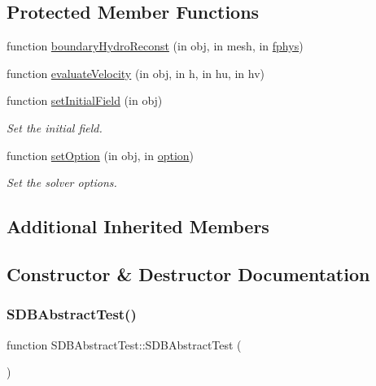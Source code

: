 \subsection*{Protected Member Functions}
\begin{DoxyCompactItemize}
\item 
function \hyperlink{class_s_d_b_abstract_test_aa1a5e37e2eb7a2b1dbe40660a5dfdb1a}{boundary\+Hydro\+Reconst} (in obj, in mesh, in \hyperlink{class_ndg_phys_a6b25724fc9474d32018439009072f0a9}{fphys})
\item 
function \hyperlink{class_s_d_b_abstract_test_ab057fe12b4c86781d113c42a091a95e2}{evaluate\+Velocity} (in obj, in h, in hu, in hv)
\item 
function \hyperlink{class_s_d_b_abstract_test_a53f2efd481578f9a7790c36389ed8e39}{set\+Initial\+Field} (in obj)
\begin{DoxyCompactList}\small\item\em Set the initial field. \end{DoxyCompactList}\item 
function \hyperlink{class_s_d_b_abstract_test_ad2c48bbf6eca30386c382be11103d498}{set\+Option} (in obj, in \hyperlink{class_ndg_phys_af91f4c54b93504e76b38a5693774dff1}{option})
\begin{DoxyCompactList}\small\item\em Set the solver options. \end{DoxyCompactList}\end{DoxyCompactItemize}
\subsection*{Additional Inherited Members}


\subsection{Constructor \& Destructor Documentation}
\mbox{\label{class_s_d_b_abstract_test_ad966b076c87655495911eb92b6723f64}} 
\subsubsection{\texorpdfstring{S\+D\+B\+Abstract\+Test()}{SDBAbstractTest()}}
{\footnotesize\ttfamily function S\+D\+B\+Abstract\+Test\+::\+S\+D\+B\+Abstract\+Test (\begin{DoxyParamCaption}{ }\end{DoxyParamCaption})}



